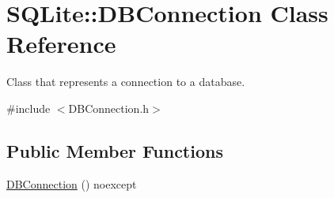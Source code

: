 \hypertarget{a00004}{\section{S\-Q\-Lite\-:\-:D\-B\-Connection Class Reference}
\label{a00004}
}


Class that represents a connection to a database.  




{\ttfamily \#include $<$D\-B\-Connection.\-h$>$}

\subsection*{Public Member Functions}
\begin{DoxyCompactItemize}
\item 
\hypertarget{a00004_a17fcc9926aa16b05b61bbce2613fe57a}{\hyperlink{a00004_a17fcc9926aa16b05b61bbce2613fe57a}{D\-B\-Connection} () noexcept}\label{a00004_a17fcc9926aa16b05b61bbce2613fe57a}


\end{DoxyCompactItemize}
